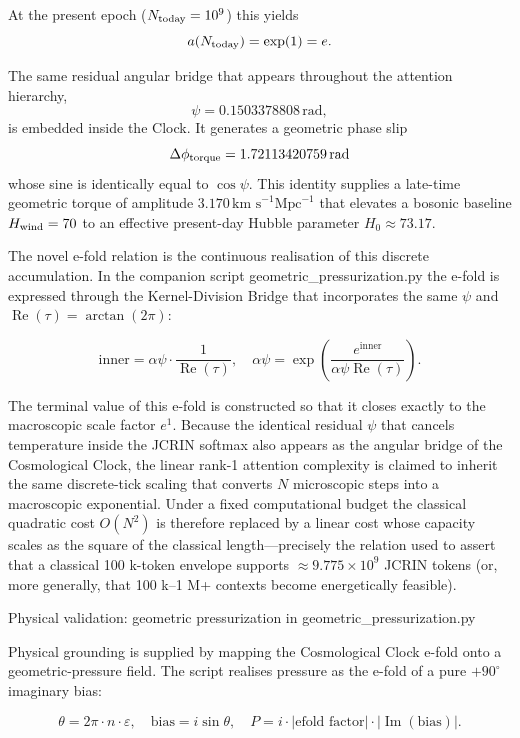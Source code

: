 At the present epoch (\(N_{\rm today} = 10^9\)) this yields
\[
a(N_{\rm today}) = \exp(1) = e.
\]

The same residual angular bridge that appears throughout the attention hierarchy,
\[
\psi = 0.1503378808\,\text{rad},
\]
is embedded inside the Clock. It generates a geometric phase slip
\[
\Delta\phi_{\rm torque} = 1.72113420759\,\text{rad}
\]
whose sine is identically equal to \(\cos\psi\). This identity supplies a late-time geometric torque of amplitude \(3.170\,\text{km s}^{-1}\text{Mpc}^{-1}\) that elevates a bosonic baseline \(H_{\rm wind} = 70\) to an effective present-day Hubble parameter \(H_0 \approx 73.17\).

The novel e-fold relation is the continuous realisation of this discrete accumulation. In the companion script geometric_pressurization.py the e-fold is expressed through the Kernel-Division Bridge that incorporates the same \(\psi\) and \(\operatorname{Re}(\tau) = \arctan(2\pi)\):

\[
\text{inner} = \alpha\psi\cdot\frac{1}{\operatorname{Re}(\tau)},
\quad
\alpha\psi = \exp\left(\frac{e^{\text{inner}}}{\alpha\psi\operatorname{Re}(\tau)}\right).
\]

The terminal value of this e-fold is constructed so that it closes exactly to the macroscopic scale factor \(e^1\). Because the identical residual \(\psi\) that cancels temperature inside the JCRIN softmax also appears as the angular bridge of the Cosmological Clock, the linear rank-1 attention complexity is claimed to inherit the same discrete-tick scaling that converts \(N\) microscopic steps into a macroscopic exponential. Under a fixed computational budget the classical quadratic cost \(O(N^2)\) is therefore replaced by a linear cost whose capacity scales as the square of the classical length—precisely the relation used to assert that a classical 100 k-token envelope supports \(\approx 9.775\times 10^9\) JCRIN tokens (or, more generally, that 100 k–1 M+ contexts become energetically feasible).

Physical validation: geometric pressurization in geometric_pressurization.py

Physical grounding is supplied by mapping the Cosmological Clock e-fold onto a geometric-pressure field. The script realises pressure as the e-fold of a pure \(+90^\circ\) imaginary bias:

\[
\theta = 2\pi\cdot n\cdot\varepsilon,
\quad
\text{bias} = i\sin\theta,
\quad
P = i\cdot\bigl|\text{efold factor}\bigr|\cdot|\operatorname{Im}(\text{bias})|.
\]

